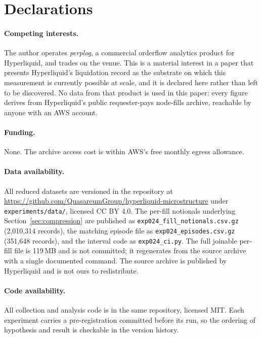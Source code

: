 \documentclass[11pt,a4paper]{article}
\begin{document}
\section*{Declarations}

\paragraph{Competing interests.} The author operates \emph{perplog}, a commercial orderflow
analytics product for Hyperliquid, and trades on the venue. This is a material interest in a
paper that presents Hyperliquid's liquidation record as the substrate on which this measurement
is currently possible at scale, and it is declared here rather than left to be discovered. No data from that
product is used in this paper: every figure derives from Hyperliquid's public requester-pays
node-fills archive, reachable by anyone with an AWS account.

\paragraph{Funding.} None. The archive access cost is within AWS's free monthly egress
allowance.

\paragraph{Data availability.} All reduced datasets are versioned in the repository at
\url{https://github.com/QuasareumGroup/hyperliquid-microstructure} under
\texttt{experiments/data/}, licensed CC BY 4.0. The per-fill notionals underlying
Section~\ref{sec:compression} are published as \texttt{exp024\_fill\_notionals.csv.gz}
(2{,}010{,}314 records), the matching episode file as \texttt{exp024\_episodes.csv.gz}
(351{,}648 records), and the interval code as \texttt{exp024\_ci.py}. The full joinable per-fill file is 119\,MB and is not committed; it
regenerates from the source archive with a single documented command. The source archive is
published by Hyperliquid and is not ours to redistribute.

\paragraph{Code availability.} All collection and analysis code is in the same repository,
licensed MIT. Each experiment carries a pre-registration committed before its run, so the
ordering of hypothesis and result is checkable in the version history.
\end{document}
